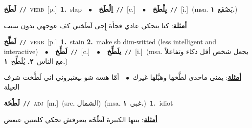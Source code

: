 \documentclass[10pt,a4paper,twoside]{article} %
\begin{document}
\begin{multicols}{2}
{\setlength\topsep{0pt}\textbf{\foreignlanguage{arabic}{لَطَخ}}\ {\color{gray}\texttt{//}\color{black}}\ \textsc{verb}\ [p.]\ \textbf{1.}~slap\ \ $\bullet$\ \ \setlength\topsep{0pt}\textbf{\foreignlanguage{arabic}{اِلْطَخ}}\ {\color{gray}\texttt{//}\color{black}}\ [c.]\ \ $\bullet$\ \ \setlength\topsep{0pt}\textbf{\foreignlanguage{arabic}{يِلْطَخ}}\ {\color{gray}\texttt{//}\color{black}}\ [i.]\ \color{gray}(msa. \foreignlanguage{arabic}{يَصْفَع}~\foreignlanguage{arabic}{\textbf{١.}})\color{black}\  \begin{flushright}\color{gray}\foreignlanguage{arabic}{\textbf{\underline{\foreignlanguage{arabic}{أمثلة}}}: كنا بنحكي عادي فجأة إِجى لَطَخني كف عوجهي بدون سبب}\end{flushright}\color{black}} \vspace{2mm}

{\setlength\topsep{0pt}\textbf{\foreignlanguage{arabic}{لَطَّخ}}\ {\color{gray}\texttt{//}\color{black}}\ \textsc{verb}\ [p.]\ \textbf{1.}~stain  \textbf{2.}~make sb dim-witted (less intelligent and interactive)\ \ $\bullet$\ \ \setlength\topsep{0pt}\textbf{\foreignlanguage{arabic}{لَطِّخ}}\ {\color{gray}\texttt{//}\color{black}}\ [c.]\ \ $\bullet$\ \ \setlength\topsep{0pt}\textbf{\foreignlanguage{arabic}{يلَطِّخ}}\ {\color{gray}\texttt{//}\color{black}}\ [i.]\ \color{gray}(msa. \foreignlanguage{arabic}{يجعل شخص أقل ذكاء وتفاعلاً مع الناس}~\foreignlanguage{arabic}{\textbf{٢.}}  \foreignlanguage{arabic}{يُلَطِّخ}~\foreignlanguage{arabic}{\textbf{١.}})\color{black}\  \begin{flushright}\color{gray}\foreignlanguage{arabic}{\textbf{\underline{\foreignlanguage{arabic}{أمثلة}}}: يمنى ماحدى لطَّخها وهبَّلها غيرك\ $\bullet$\ \  أمّا هسه شو بيعتبروني اني لَطَّخت شرف العيلة}\end{flushright}\color{black}} \vspace{2mm}

{\setlength\topsep{0pt}\textbf{\foreignlanguage{arabic}{لَطْخَة}}\ {\color{gray}\texttt{//}\color{black}}\ \textsc{adj}\ [m.]\ (src. \color{gray}\foreignlanguage{arabic}{الشمال}\color{black})\ \color{gray}(msa. \foreignlanguage{arabic}{غبي}~\foreignlanguage{arabic}{\textbf{١.}})\color{black}\ \textbf{1.}~idiot\  \begin{flushright}\color{gray}\foreignlanguage{arabic}{\textbf{\underline{\foreignlanguage{arabic}{أمثلة}}}: بنتها الكبيرة لَطَْخَة بتعرفش تحكي كلمتين عبعض}\end{flushright}\color{black}} \vspace{2mm}


\end{multicols}
\end{document}
